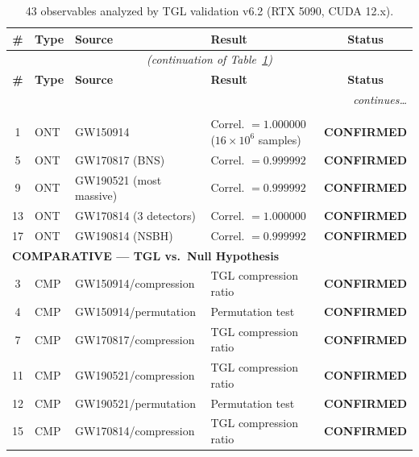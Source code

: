 \documentclass[12pt,a4paper,twoside]{article}
\newcommand{\confirmed}{\textcolor{tglgreen}{\textbf{CONFIRMED}}}
\begin{document}
\begin{small}
\begin{longtable}{clp{3.5cm}p{4.5cm}c}
\caption{43 observables analyzed by TGL validation v6.2 (RTX 5090, CUDA 12.x).}
\label{tab:43obs}\\
\toprule
\textbf{\#} & \textbf{Type} & \textbf{Source} & \textbf{Result} & \textbf{Status} \\
\midrule
\endfirsthead
\multicolumn{5}{c}{\textit{(continuation of Table~\ref{tab:43obs})}} \\
\toprule
\textbf{\#} & \textbf{Type} & \textbf{Source} & \textbf{Result} & \textbf{Status} \\
\midrule
\endhead
\midrule
\multicolumn{5}{r}{\textit{continues\ldots}} \\
\endfoot
\bottomrule
\endlastfoot
%
\multicolumn{5}{l}{\textbf{ONTOLOGICAL --- Transformation $g = \sqrt{|L|}$}} \\
\midrule
1  & ONT & GW150914             & Correl. $= 1.000000$ ($16\times10^6$ samples) & \confirmed \\
5  & ONT & GW170817 (BNS)       & Correl. $= 0.999992$                           & \confirmed \\
9  & ONT & GW190521 (most massive) & Correl. $= 0.999992$                        & \confirmed \\
13 & ONT & GW170814 (3 detectors)& Correl. $= 1.000000$                         & \confirmed \\
17 & ONT & GW190814 (NSBH)      & Correl. $= 0.999992$                           & \confirmed \\
%
\midrule
\multicolumn{5}{l}{\textbf{COMPARATIVE --- TGL vs.\ Null Hypothesis}} \\
\midrule
3  & CMP & GW150914/compression  & TGL compression ratio                      & \confirmed \\
4  & CMP & GW150914/permutation & Permutation test                     & \confirmed \\
7  & CMP & GW170817/compression  & TGL compression ratio                      & \confirmed \\
11 & CMP & GW190521/compression  & TGL compression ratio                      & \confirmed \\
12 & CMP & GW190521/permutation & Permutation test                     & \confirmed \\
15 & CMP & GW170814/compression  & TGL compression ratio                      & \confirmed \\

\end{longtable}
\end{small}
\end{document}
